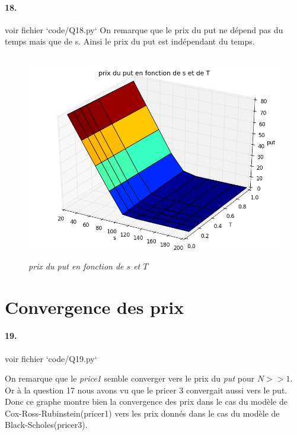 \documentclass[10pt]{article}
\begin{document}
  \paragraph{18.} voir fichier `code/Q18.py`
  On remarque que le prix du put ne dépend pas du temps mais que de s. Ainsi le prix du put est indépendant du temps.
  
  \begin{figure}[H]
    \begin{center}
      \includegraphics[height=9cm,keepaspectratio]{./images/Q18.png}
    \end{center}
    \caption{\textit{prix du put en fonction de $s$ et $T$}}
    \label{Q18}
  \end{figure}
  
  \newpage
  \section{Convergence des prix}
  \paragraph{19.} voir fichier `code/Q19.py`
  
  On remarque que le \textit{price1} semble converger vers le prix du \textit{put} pour $N >> 1$. Or à la question 17 nous avons vu que le pricer 3 convergait aussi vers le put. Donc ce graphe montre bien la convergence des prix dans le cas du modèle de Cox-Ross-Rubinstein(pricer1) vers les prix donnés dans le cas du modèle de Black-Scholes(pricer3).
  
\end{document}
